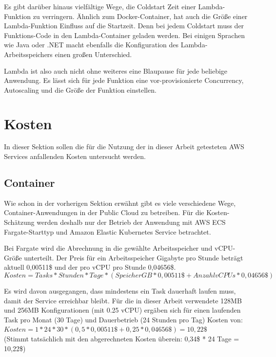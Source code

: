 Es gibt darüber hinaus vielfältige Wege, die Coldstart Zeit einer Lambda-Funktion zu verringern. Ähnlich zum Docker-Container, hat auch die Größe einer Lambda-Funktion Einfluss auf die Startzeit. Denn bei jedem Coldstart muss der Funktions-Code in den Lambda-Container geladen werden. Bei einigen Sprachen wie Java oder .NET macht ebenfalls die Konfiguration des Lambda-Arbeitsspeichers einen großen Unterschied\cite{malishev_aws_2019}. 

Lambda ist also auch nicht ohne weiteres eine Blaupause für jede beliebige Anwendung. Es lässt sich für jede Funktion eine vor-provisionierte Concurrency, Autoscaling und die Größe der Funktion einstellen. 

\section{Kosten}
In dieser Sektion sollen die für die Nutzung der in dieser Arbeit getesteten AWS Services anfallenden Kosten untersucht werden.

\subsection{Container}
Wie schon in der vorherigen Sektion erwähnt gibt es viele verschiedene Wege, Container-Anwendungen in der Public Cloud zu betreiben. Für die Kosten-Schätzung werden deshalb nur der Betrieb der Anwendung mit AWS ECS Fargate-Starttyp und Amazon Elastic Kubernetes Service betrachtet.

Bei Fargate wird die Abrechnung in die gewählte Arbeitsspeicher und vCPU-Größe unterteilt. Der Preis für ein Arbeitsspeicher Gigabyte pro Stunde beträgt aktuell 0,00511\$ und der pro vCPU pro Stunde 0,04656\$.  \\


\begin{equation}
Kosten = Tasks * Stunden * Tage * (SpeicherGB * 0,00511\$ + AnzahlvCPUs * 0,04656\$)
\end{equation}

Es wird davon ausgegangen, dass mindestens ein Task dauerhaft laufen muss, damit der Service erreichbar bleibt. Für die in dieser Arbeit verwendete 128MB und 256MB Konfigurationen (mit 0.25 vCPU) ergäben sich für einen laufenden Task pro Monat (30 Tage) und Dauerbetrieb (24 Stunden pro Tag) Kosten von: \\

$Kosten = 1 * 24 * 30 * (0,5 * 0,00511\$ + 0,25 * 0,04656\$) = 10,22\$$ \\
(Stimmt tatsächlich mit den abgerechneten Kosten überein: 0,34\$ * 24 Tage = 10,22\$)

